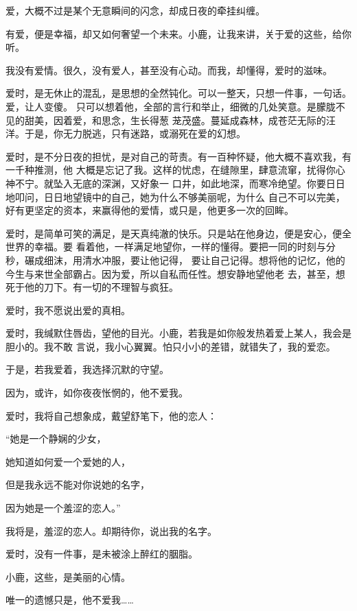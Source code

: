 		爱，大概不过是某个无意瞬间的闪念，却成日夜的牵挂纠缠。

		有爱，便是幸福，却又如何奢望一个未来。小鹿，让我来讲，关于爱的这些，给你听。

		我没有爱情。很久，没有爱人，甚至没有心动。而我，却懂得，爱时的滋味。

		爱时，是无休止的混乱，是思想的全然钝化。可以一整天，只想一件事，一句话。爱，让人变傻。
	只可以想着他，全部的言行和举止，细微的几处笑意。是朦胧不见的甜美，因着爱，和思念，生长得葱
	茏茂盛。蔓延成森林，成苍茫无际的汪洋。于是，你无力脱逃，只有迷路，或溺死在爱的幻想。

		爱时，是不分日夜的担忧，是对自己的苛责。有一百种怀疑，他大概不喜欢我，有一千种推测，他
	大概是忘记了我。这样的忧虑，在缝隙里，肆意流窜，扰得你心神不宁。就坠入无底的深渊，又好象一
	口井，如此地深，而寒冷绝望。你要日日地叩问，日日地望镜中的自己，她为什么不够美丽呢，为什么
	自己不可以完美，好有更坚定的资本，来赢得他的爱情，或只是，他更多一次的回眸。

		爱时，是简单可笑的满足，是天真纯澈的快乐。只是站在他身边，便是安心，便全世界的幸福。要
	看着他，一样满足地望你，一样的懂得。要把一同的时刻与分秒，碾成细沫，用清水冲服，要让他记得，
	要让自己记得。想将他的记忆，他的今生与来世全部霸占。因为爱，所以自私而任性。想安静地望他老
	去，甚至，想死于他的刀下。有一切的不理智与疯狂。

		爱时，我不愿说出爱的真相。

		爱时，我缄默住唇齿，望他的目光。小鹿，若我是如你般发热着爱上某人，我会是胆小的。我不敢
	言说，我小心翼翼。怕只小小的差错，就错失了，我的爱恋。


		于是，若我爱着，我选择沉默的守望。\par
		因为，或许，如你夜夜怅惘的，他不爱我。\par
		爱时，我将自己想象成，戴望舒笔下，他的恋人：\par
		“她是一个静娴的少女，\par
		她知道如何爱一个爱她的人，\par
		但是我永远不能对你说她的名字，\par
		因为她是一个羞涩的恋人。”\par
		我将是，羞涩的恋人。却期待你，说出我的名字。\par
		爱时，没有一件事，是未被涂上醉红的胭脂。\par
		小鹿，这些，是美丽的心情。\par
		唯一的遗憾只是，他不爱我……

	\endwriting



